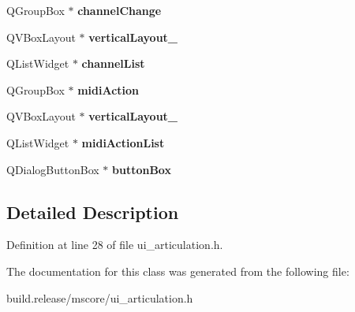 \begin{DoxyCompactItemize}
\item 
\mbox{\label{class_ui___articulation_properties_a89ee6f33e8bb400e8297c0f01ec6fed1}} 
Q\+Group\+Box $\ast$ {\bfseries channel\+Change}
\item 
\mbox{\label{class_ui___articulation_properties_a69c0a6b52ba726e4ef6726893227c4d9}} 
Q\+V\+Box\+Layout $\ast$ {\bfseries vertical\+Layout\+\_}
\item 
\mbox{\label{class_ui___articulation_properties_a77f44a796e3fdb390f328244f8b7ae0e}} 
Q\+List\+Widget $\ast$ {\bfseries channel\+List}
\item 
\mbox{\label{class_ui___articulation_properties_afe1d5fe3c4cf969481f3f902d497a04a}} 
Q\+Group\+Box $\ast$ {\bfseries midi\+Action}
\item 
\mbox{\label{class_ui___articulation_properties_a9d4d57efeca8f42b3e98484116665fbb}} 
Q\+V\+Box\+Layout $\ast$ {\bfseries vertical\+Layout\+\_}
\item 
\mbox{\label{class_ui___articulation_properties_a235270ecd24dd04fd2156e211444fe35}} 
Q\+List\+Widget $\ast$ {\bfseries midi\+Action\+List}
\item 
\mbox{\label{class_ui___articulation_properties_addbee942d9490c1c91a1dc3340df170b}} 
Q\+Dialog\+Button\+Box $\ast$ {\bfseries button\+Box}
\end{DoxyCompactItemize}


\subsection{Detailed Description}


Definition at line 28 of file ui\+\_\+articulation.\+h.



The documentation for this class was generated from the following file\+:\begin{DoxyCompactItemize}
\item 
build.\+release/mscore/ui\+\_\+articulation.\+h\end{DoxyCompactItemize}

